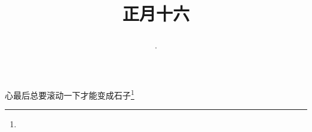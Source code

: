 \title{\date[d=25,m=2,y=2024][year:cn-y,年,month:cn,day:cn,日,·,weekday]·正月十六 }
心最后总要滚动一下才能变成石子\footnote{ }

